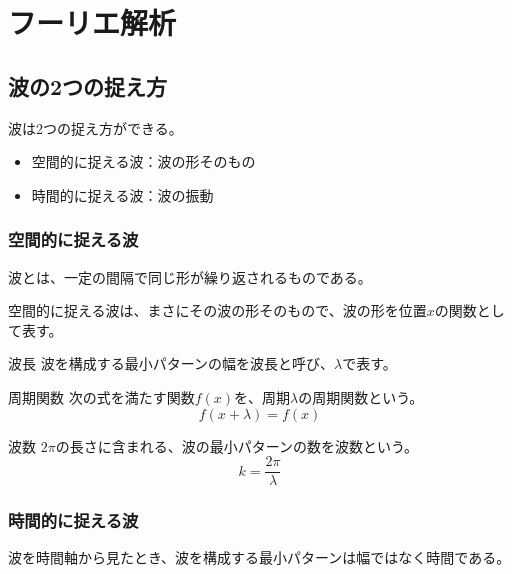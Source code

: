 \documentclass[../math-imaging]{subfiles}
\begin{document}
\chapter{フーリエ解析}

\section{波の2つの捉え方}

波は2つの捉え方ができる。

\begin{itemize}
  \item 空間的に捉える波：波の形そのもの
  \item 時間的に捉える波：波の振動
\end{itemize}

\subsection{空間的に捉える波}

波とは、一定の間隔で同じ形が繰り返されるものである。

空間的に捉える波は、まさにその波の形そのもので、波の形を位置$x$の関数として表す。

\begin{definition}{波長}
  波を構成する最小パターンの幅を波長と呼び、$\lambda$で表す。
\end{definition}

\begin{definition}{周期関数}
  次の式を満たす関数$f(x)$を、周期$\lambda$の周期関数という。
  \LARGE
  \begin{equation}
    f(x+\lambda) = f(x)
  \end{equation}
\end{definition}

\begin{definition}{波数}
  $2\pi$の長さに含まれる、波の最小パターンの数を波数という。
  \LARGE
  \begin{equation}
    k = \dfrac{2\pi}{\lambda}
  \end{equation}
\end{definition}

\subsection{時間的に捉える波}

波を時間軸から見たとき、波を構成する最小パターンは幅ではなく時間である。
\end{document}
